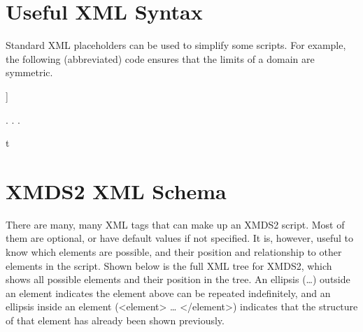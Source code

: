 \documentclass[letterpaper,10pt,english]{sphinxmanual}
\begin{document}
\section{Useful XML Syntax}
\label{\detokenize{reference_usefulXMLSyntax:useful-xml-syntax}}\label{\detokenize{reference_usefulXMLSyntax:referenceusefulxmlsyntax}}\label{\detokenize{reference_usefulXMLSyntax::doc}}
\sphinxAtStartPar
Standard XML placeholders can be used to simplify some scripts.  For example, the following (abbreviated) code ensures that the limits of a domain are symmetric.

\begin{sphinxVerbatim}[commandchars=\\\{\}]
\PYG{c+cp}{\PYGZlt{}!DOCTYPE simulation [}
]\PYGZgt{}
   

    . . .

         t 
               
\end{sphinxVerbatim}

\ignorespaces 

\section{XMDS2 XML Schema}
\label{\detokenize{reference_schema:xmds2-xml-schema}}\label{\detokenize{reference_schema:referenceschema}}\label{\detokenize{reference_schema:index-0}}\label{\detokenize{reference_schema::doc}}
\sphinxAtStartPar
There are many, many XML tags that can make up an XMDS2 script. Most of them are optional, or have default values if not specified. It is, however, useful to know which elements are possible, and their position and relationship to other elements in the script. Shown below is the full XML tree for XMDS2, which shows all possible elements and their position in the tree. An ellipsis (…) outside an element indicates the element above can be repeated indefinitely, and an ellipsis inside an element (\textless{}element\textgreater{} … \textless{}/element\textgreater{}) indicates that the structure of that element has already been shown previously.
\end{document}

